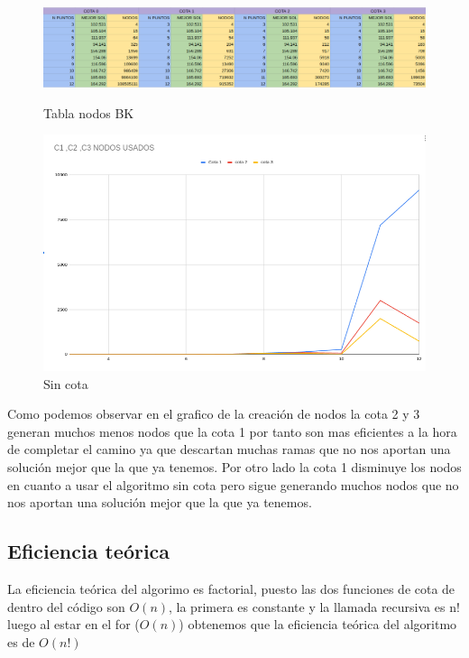 \documentclass[11pt,openany]{book}
\begin{document}
\begin{figure}[H]
    \centering
    \begin{minipage}{.48\textwidth}
        \centering
        \includegraphics[width=1\linewidth]{assets/Img/tablanodosbk.png}
        \caption{Tabla nodos BK}
        \label{Tabla nodos BK}
  \end{minipage}%
    \begin{minipage}{.48\textwidth}
        \centering
        \includegraphics[width=1\linewidth]{assets/Img/graficonodos.png}
        \caption{Sin cota}
        \label{TAbla nodos BK}
  \end{minipage}%
\end{figure}
Como podemos observar en el grafico de la creación de nodos la cota 2 y 3 generan muchos menos nodos que la cota 1 por tanto son mas eficientes 
a la hora de completar el camino ya que descartan muchas ramas que no nos aportan una solución mejor que la que ya tenemos.
Por otro lado la cota 1 disminuye los nodos en cuanto a usar el algoritmo sin cota pero sigue generando muchos nodos que no nos aportan una solución mejor que la que ya tenemos.
\newpage
\subsection{Eficiencia teórica}
La eficiencia teórica del algorimo es factorial, puesto las dos funciones de cota de dentro del código son $O(n)$, la primera es constante y la llamada recursiva es n! luego al estar en el for ($O(n)$)
obtenemos que la eficiencia teórica del algoritmo es de $O(n!)$
\end{document}
